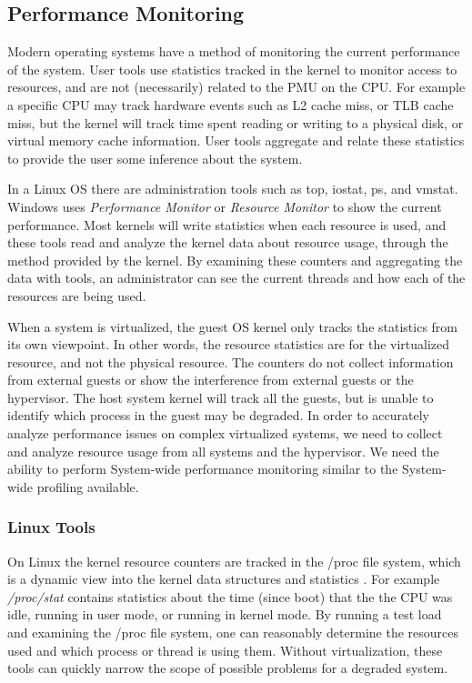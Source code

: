 \subsection{Performance Monitoring}
Modern operating systems have a method of monitoring the current performance of the system.  User tools use statistics tracked in the kernel to monitor access to resources, and are not (necessarily) related to the PMU on the CPU.  For example a specific CPU may track hardware events such as L2 cache miss, or TLB cache miss, but the kernel will track time spent reading or writing to a physical disk, or virtual memory cache information.  User tools aggregate and relate these statistics to provide the user some inference about the system.

\indent In a Linux OS there are administration tools such as top, iostat, ps, and vmstat.  
Windows uses \emph{Performance Monitor} or \emph{Resource Monitor} to show the current performance.  
Most kernels will write statistics when each resource is used, and these tools read and analyze the kernel data about resource usage, through the method provided by the kernel.
By examining these counters and aggregating the data with tools, an administrator can see the current threads and how each of the resources are being used. 

\indent When a system is virtualized, the guest OS kernel only tracks the statistics from its own viewpoint.  
In other words, the resource statistics are for the virtualized resource, and not the physical resource.   
The counters do not collect information from external guests or show the interference from external guests or the hypervisor.  
The host system kernel will track all the guests, but is unable to identify which process in the guest may be degraded.
In order to accurately analyze performance issues on complex virtualized systems, we need to collect and analyze resource usage from all systems and the hypervisor.  
We need the ability to perform System-wide performance monitoring similar to the System-wide profiling available.

\subsubsection{Linux Tools}
\indent On Linux the kernel resource counters are tracked in the /proc file system, which is a dynamic view into the kernel data structures and statistics \cite{proc}.  
For example \emph{/proc/stat} contains statistics about the time (since boot) that the the CPU was idle, running in user mode, or running in kernel mode.
By running a test load and examining the /proc file system, one can reasonably determine the resources used and which process or thread is using them.  
Without virtualization, these tools can quickly narrow the scope of possible problems for a degraded system. 

